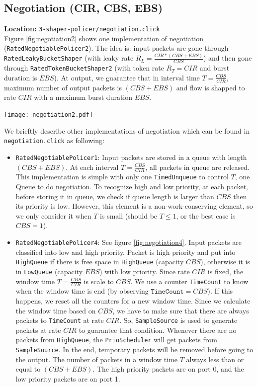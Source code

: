 \documentclass[a4paper]{article}
\begin{document}
  \subsection{Negotiation (CIR, CBS, EBS)}
  \textbf{Location:} \texttt{3-shaper-policer/negotiation.click} \\
  Figure \ref{fig:negotiation2} shows one implementation of negotiation (\texttt{RatedNegotiablePolicer2}). The idea is: input packets are gone through \texttt{RatedLeakyBucketShaper} (with leaky rate $R_L = \frac{CIR * (CBS + EBS)}{CBS}$) and then gone through \texttt{RatedTokenBucketShaper2} (with token rate $R_T = CIR$ and burst duration is $EBS$). At output, we guarantee that in interval time $T = \frac{CBS}{CIR}$, maximum number of output packets is $(CBS + EBS)$ and flow is shapped to rate $CIR$ with a maximum burst duration $EBS$.   
  \begin{center}
	\texttt{[image: negotiation2.pdf]}
	\label{fig:negotiation2}
  \end{center}  
  We brieftly describe other implementations of negotiation which can be found in \texttt{negotiation.click} as following:
  \begin{itemize}
  	\item \texttt{RatedNegotiablePolicer1}: Input packets are stored in a queue with length $(CBS + EBS)$. At each interval $T = \frac{CBS}{CIR}$, all packets in queue are released. This implementation is simple with only one \texttt{TimedUnqueue} to control $T$, one Queue to do negotiation. To recognize high and low priority, at each packet, before storing it in queue, we check if queue length is larger than $CBS$ then its priority is low. However, this element is a non-work-conserving element, so we only consider it when $T$ is small (should be $T \le 1$, or the best case is $CBS = 1$).
  	\item \texttt{RatedNegotiablePolicer4}: See figure \ref{fig:negotiation4}. Input packets are classified into low and high priority. Packet is high priority and put into \texttt{HighQueue} if there is free space in \texttt{HighQueue} (capacity $CBS$), otherwise it is in \texttt{LowQueue} (capacity $EBS$) with low priority. Since rate $CIR$ is fixed, the window time $T = \frac{CBS}{CIR}$ is scale to $CBS$. We use a counter \texttt{TimeCount} to know when the window time is end (by observing $\texttt{TimeCount} = CBS$). If this happens, we reset all the counters for a new window time. Since we calculate the window time based on $CBS$, we have to make sure that there are always packets to \texttt{TimeCount} at rate $CIR$. So, \texttt{SampleSource} is used to generate packets at rate $CIR$ to guarantee that condition. Whenever there are no packets from \texttt{HighQueue}, the \texttt{PrioScheduler} will get packets from \texttt{SampleSource}. In the end, temporary packets will be removed before going to the output. The number of packets in a window time $T$ always less than or equal to $(CBS+EBS)$. The high priority packets are on port 0, and the low priority packets are on port 1. 
  \end{itemize}
\end{document}
